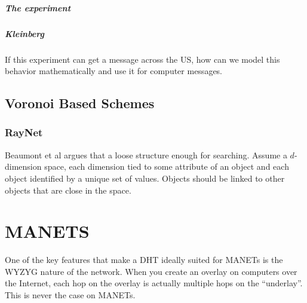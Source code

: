\documentclass[10pt,letterpaper]{report}
\begin{document}
\paragraph{The experiment}
\paragraph{Kleinberg}
If this experiment can get a message across the US, how can we model this behavior mathematically and use it for computer messages.


\section{Voronoi Based Schemes}

\subsection{RayNet}

Beaumont et al argues that a loose structure enough for searching.  Assume a $d$-dimension space, each dimension tied to some attribute of an object and each object identified by a unique set of values.  Objects should be linked to other objects that are close in the space.




\chapter{MANETS}
One of the key features that make a DHT ideally suited for MANETs is the WYZYG nature of the network.  When you create an overlay on computers over the Internet, each hop on the overlay is actually multiple hops on the ``underlay''.  This is never the case on MANETs.
\end{document}
